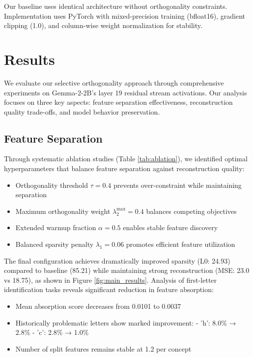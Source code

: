 \documentclass{article} %
\begin{document}
Our baseline uses identical architecture without orthogonality constraints. Implementation uses PyTorch with mixed-precision training (bfloat16), gradient clipping (1.0), and column-wise weight normalization for stability.

\section{Results}
\label{sec:results}

We evaluate our selective orthogonality approach through comprehensive experiments on Gemma-2-2B's layer 19 residual stream activations. Our analysis focuses on three key aspects: feature separation effectiveness, reconstruction quality trade-offs, and model behavior preservation.

\subsection{Feature Separation}
Through systematic ablation studies (Table \ref{tab:ablation}), we identified optimal hyperparameters that balance feature separation against reconstruction quality:

\begin{itemize}
\item Orthogonality threshold $\tau = 0.4$ prevents over-constraint while maintaining separation
\item Maximum orthogonality weight $\lambda_2^{\text{max}} = 0.4$ balances competing objectives
\item Extended warmup fraction $\alpha = 0.5$ enables stable feature discovery
\item Balanced sparsity penalty $\lambda_1 = 0.06$ promotes efficient feature utilization
\end{itemize}

The final configuration achieves dramatically improved sparsity (L0: 24.93) compared to baseline (85.21) while maintaining strong reconstruction (MSE: 23.0 vs 18.75), as shown in Figure \ref{fig:main_results}. Analysis of first-letter identification tasks reveals significant reduction in feature absorption:

\begin{itemize}
\item Mean absorption score decreases from 0.0101 to 0.0037
\item Historically problematic letters show marked improvement:
  - 'h': 8.0\% → 2.8\%
  - 'c': 2.8\% → 1.0\%
\item Number of split features remains stable at 1.2 per concept
\end{itemize}
\end{document}
